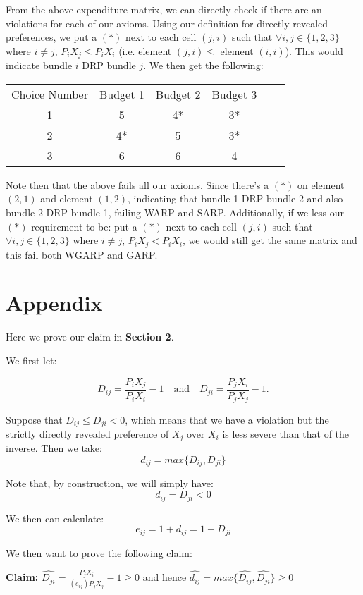 \documentclass{article} %
\begin{document}
From the above expenditure matrix, we can directly check if there are an violations for each of our axioms. Using our definition for directly revealed preferences, we put a $(*)$ next to each cell $(j,i)$ such that $\forall i,j\in\{1,2,3\}$ where $i\not=j$, $P_iX_j\leq P_iX_i$ (i.e. element $(j,i)\leq$ element $(i,i)$). This would indicate bundle $i$ DRP bundle $j$. We then get the following:

\begin{center}
\begin{tabular}{ cccccc } 
Choice Number & Budget 1 & Budget 2 & Budget 3 \\
1&5&4*&3* \\
2&4*&5&3* \\
3&6&6&4
\end{tabular}
\end{center}

Note then that the above fails all our axioms. Since there's a $(*)$ on element $(2,1)$ and element $(1,2)$, indicating that bundle 1 DRP bundle 2 and also bundle 2 DRP bundle 1, failing WARP and SARP. Additionally, if we less our $(*)$ requirement to be: put a $(*)$ next to each cell $(j,i)$ such that $\forall i,j\in\{1,2,3\}$ where $i\not=j$, $P_iX_j<P_iX_i$, we would still get the same matrix and this fail both WGARP and GARP.

\section{Appendix}

Here we prove our claim in \textbf{Section 2}.


We first let:


$$D_{ij}=\frac{P_iX_j}{P_iX_i}-1 \quad \text{and} \quad D_{ji}=\frac{P_jX_i}{P_jX_j}-1.$$



Suppose that $D_{ij}\leq D_{ji}<0$, which means that we have a violation but the strictly directly revealed preference of $X_j$ over $X_i$ is less severe than that of the inverse. Then we take:
$$d_{ij}=max\{D_{ij},D_{ji}\}$$

Note that, by construction, we will simply have:
$$d_{ij}=D_{ji}<0$$

We then can calculate:
$$e_{ij}=1+d_{ij}=1+D_{ji}$$

We then want to prove the following claim:


\textbf{Claim:} $\hat{D_{ji}}=\frac{P_jX_i}{(e_{ij})P_jX_j}-1\geq0$ and hence $\hat{d_{ij}}=max\{\hat{D_{ij}},\hat{D_{ji}}\}\geq0$
\end{document}
